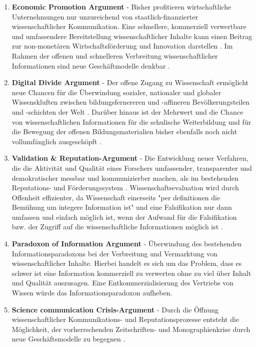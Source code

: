 \begin{enumerate}
\item \textbf{Economic Promotion Argument} - Bisher profitieren wirtschaftliche Unternehmungen nur unzureichend von staatlich-finanzierter wissenschaftlicher Kommunikation. Eine schnellere, kommerziell verwertbare und umfassendere Bereitstellung wissenschaftlicher Inhalte kann einen Beitrag zur non-monetären Wirtschaftsförderung und Innovation darstellen \cite{heise_2012} \cite{suchen OECD EU}. Im Rahmen der offenen und schnelleren Verbreitung wissenschaftlicher Informationen sind neue Geschäftmodelle denkbar \cite{suchen}.
\item \textbf{Digital Divide Argument} - Der offene Zugang zu Wissenschaft ermöglicht neue Chancen für die Überwindung sozialer, nationaler und globaler Wissenskluften \cite{suchen} zwischen bildungsfernereren und -affineren Bevölkerungsteilen und -schichten der Welt \cite{boai_2012}. Darüber hinaus ist der Mehrwert und die Chance von wissenschaftlichen Informationen für die schulische Weiterbildung und für die Bewegung der offenen Bildungsmaterialien bisher ebenfalls noch nicht vollumfänglich ausgeschöpft \cite{heise_lernen_2013}.
\item \textbf{Validation & Reputation-Argument} - Die Entwicklung neuer Verfahren, die die Aktivität und Qualität eines Forschers umfassender, transparenter und demokratischer messbar und kommunizierber machen, als im bestehenden Reputations- und Förderungssystem \cite{chalmers_2009_avoidable_waste}. Wissenschaftsevaluation wird durch Offenheit effizienter, da Wissenschaft einerseits "per definitionen die Bemühung um integere Information ist" \cite{umstatter_2007_qualitatssicherung} und eine Falsifikation nur dann umfassen und einfach möglich ist, wenn der Aufwand für die Falsifikation bzw. der Zugriff auf die wissenschaftliche Informationen möglich ist \cite{umstatter_2007_qualitatssicherung}.
\item \textbf{Paradoxon of Information Argument} - Überwindung des bestehenden Informationsparadoxons bei der Verbreitung und Vermarktung von wissenschaftlicher Inhalte. Hierbei handelt es sich um das Problem, dass es schwer ist eine Information kommerziell zu verwerten ohne zu viel über Inhalt und Qualität auszusagen. Eine Entkommerzialisierung des Vertriebs von Wissen  würde das Informationsparadoxon aufheben.
\item \textbf{Science communication Crisis-Argument} - Durch die Öffnung wissenschaftlicher Kommunikations- und Reputationsprozesse entsteht die Möglichkeit, der vorherrschenden Zeitschriften- und Monographienkrise durch neue Geschäftsmodelle zu begegnen \cite{muller_2010_open}.

\end{enumerate}
